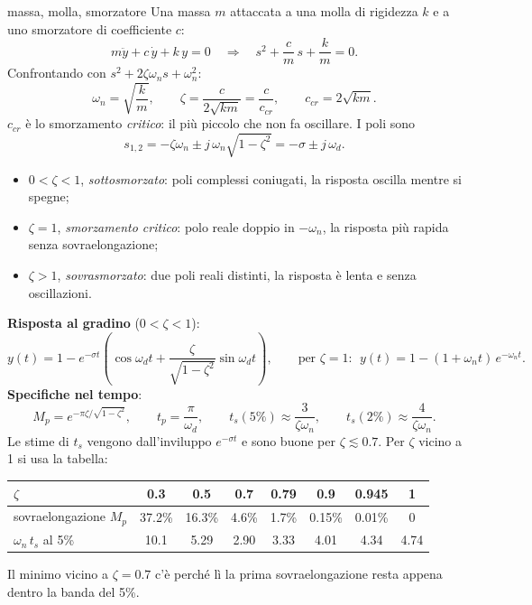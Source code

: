 \documentclass[11pt,a4paper]{article}
\begin{document}
\begin{teoria}{massa, molla, smorzatore}
Una massa $m$ attaccata a una molla di rigidezza $k$ e a uno smorzatore di coefficiente $c$:
\[
m\ddot y + c\,\dot y + k\,y = 0 \quad\Rightarrow\quad s^2 + \frac{c}{m}\,s + \frac{k}{m} = 0 .
\]
Confrontando con $s^2 + 2\zeta\omega_n s + \omega_n^2$:
\[
\omega_n = \sqrt{\frac{k}{m}}, \qquad \zeta = \frac{c}{2\sqrt{km}} = \frac{c}{c_{cr}}, \qquad c_{cr} = 2\sqrt{km}.
\]
$c_{cr}$ è lo smorzamento \emph{critico}: il più piccolo che non fa oscillare. I poli sono
\[
s_{1,2} = -\zeta\omega_n \pm j\,\omega_n\sqrt{1 - \zeta^2} = -\sigma \pm j\,\omega_d .
\]
\begin{itemize}
  \item $0 < \zeta < 1$, \emph{sottosmorzato}: poli complessi coniugati, la risposta oscilla mentre si spegne;
  \item $\zeta = 1$, \emph{smorzamento critico}: polo reale doppio in $-\omega_n$, la risposta più rapida senza sovraelongazione;
  \item $\zeta > 1$, \emph{sovrasmorzato}: due poli reali distinti, la risposta è lenta e senza oscillazioni.
\end{itemize}
\textbf{Risposta al gradino} ($0 < \zeta < 1$):
\[
y(t) = 1 - e^{-\sigma t}\left(\cos\omega_d t + \frac{\zeta}{\sqrt{1-\zeta^2}}\sin\omega_d t\right), \qquad
\text{per } \zeta = 1:\ \ y(t) = 1 - (1 + \omega_n t)\,e^{-\omega_n t}.
\]
\textbf{Specifiche nel tempo}:
\[
M_p = e^{-\pi\zeta/\sqrt{1-\zeta^2}}, \qquad t_p = \frac{\pi}{\omega_d}, \qquad t_s(5\%) \approx \frac{3}{\zeta\omega_n}, \qquad t_s(2\%) \approx \frac{4}{\zeta\omega_n}.
\]
Le stime di $t_s$ vengono dall'inviluppo $e^{-\sigma t}$ e sono buone per $\zeta \lesssim 0.7$. Per $\zeta$ vicino a 1 si usa la tabella:

\begin{center}
\small
\begin{tabular}{@{}lccccccc@{}}
\toprule
$\zeta$ & 0.3 & 0.5 & 0.7 & 0.79 & 0.9 & 0.945 & 1 \\
\midrule
sovraelongazione $M_p$ & 37.2\% & 16.3\% & 4.6\% & 1.7\% & 0.15\% & 0.01\% & 0 \\
$\omega_n\, t_s$ al 5\% & 10.1 & 5.29 & 2.90 & 3.33 & 4.01 & 4.34 & 4.74 \\
\bottomrule
\end{tabular}
\end{center}
Il minimo vicino a $\zeta = 0.7$ c'è perché lì la prima sovraelongazione resta appena dentro la banda del 5\%.
\end{teoria}
\end{document}
